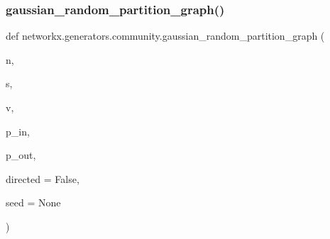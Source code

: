 \subsubsection{\texorpdfstring{gaussian\+\_\+random\+\_\+partition\+\_\+graph()}{gaussian\_random\_partition\_graph()}}
{\footnotesize\ttfamily def networkx.\+generators.\+community.\+gaussian\+\_\+random\+\_\+partition\+\_\+graph (\begin{DoxyParamCaption}\item[{}]{n,  }\item[{}]{s,  }\item[{}]{v,  }\item[{}]{p\+\_\+in,  }\item[{}]{p\+\_\+out,  }\item[{}]{directed = {\ttfamily False},  }\item[{}]{seed = {\ttfamily None} }\end{DoxyParamCaption})}

